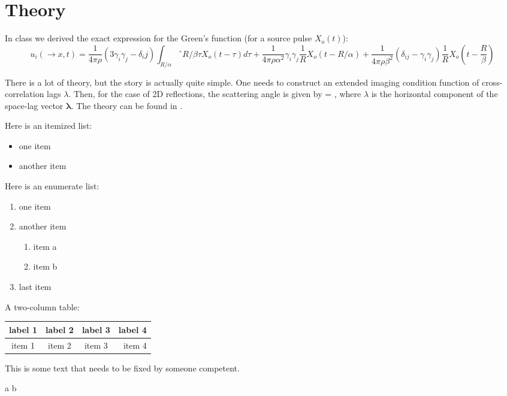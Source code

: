 \section{Theory}

\def\hh{{\boldsymbol{\lambda}} }

In class we derived the exact expression for the Green's function 
(for a source pulse $X_o(t)$):
\begin{equation}
  u_{i}(\rightarrow{x},t) = \frac{1}{4\pi\rho}(3\gamma_i \gamma_j-\delta_ij)
     \int_{R/\alpha}ˆ{R/\beta} \tau X_{o}(t-\tau)d\tau 
     + \frac{1}{4\pi\rho\alpha^2} \gamma_i \gamma_j \frac{1}{R} X_o (t-R/\alpha)
     + \frac{1}{4\pi\rho\beta^2}(\delta_{ij} -\gamma_i \gamma_j)\frac{1}{R} X_o (t - \frac{R}{\beta})

\end{equation}




There is a lot of theory, but the story is actually quite simple.  One
needs to construct an extended imaging condition function of
cross-correlation lags $\lambda$. Then, for the case of 2D
reflections, the scattering angle is given by
\beq 
\tan \theta =  \;,
\eeq
where $\lambda$ is the horizontal component of the space-lag vector $\hh$.
The theory can be found in \cite{GEO68-03-10651074}.

Here is an itemized list:
\begin{itemize}
\item one item
\item another item
\end{itemize}

Here is an enumerate list:
\begin{enumerate}
\item one item
\item another item
  \begin{enumerate}
  \item item a
  \item item b
  \end{enumerate}
\item last item
\end{enumerate}

A two-column table:

\begin{minipage}{0.8\textwidth}
\centering
\begin{tabular*}{\textwidth}{ | c | c | c | r | }
  \hline
  label 1 & label 2 & label 3 & label 4 \\
  \hline 
  item 1  & item 2  & item 3  & item 4  \\
  \hline
\end{tabular*}
\end{minipage}


\def\geosout#1{}

\def\geouline#1{#1} 

This is some text that needs to be fixed by someone \geosout{smart} \geouline{competent}.


\beq
a  b
\eeq

